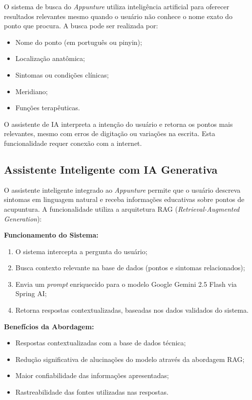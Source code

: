 O sistema de busca do \textit{Appunture} utiliza inteligência artificial para oferecer resultados relevantes mesmo quando o usuário não conhece o nome exato do ponto que procura. A busca pode ser realizada por:

\begin{itemize}
    \item Nome do ponto (em português ou pinyin);
    \item Localização anatômica;
    \item Sintomas ou condições clínicas;
    \item Meridiano;
    \item Funções terapêuticas.
\end{itemize}

O assistente de IA interpreta a intenção do usuário e retorna os pontos mais relevantes, mesmo com erros de digitação ou variações na escrita. Esta funcionalidade requer conexão com a internet.

\subsection{Assistente Inteligente com IA Generativa}

O assistente inteligente integrado ao \textit{Appunture} permite que o usuário descreva sintomas em linguagem natural e receba informações educativas sobre pontos de acupuntura. A funcionalidade utiliza a arquitetura RAG (\textit{Retrieval-Augmented Generation}):

\textbf{Funcionamento do Sistema:}
\begin{enumerate}
    \item O sistema intercepta a pergunta do usuário;
    \item Busca contexto relevante na base de dados (pontos e sintomas relacionados);
    \item Envia um \textit{prompt} enriquecido para o modelo Google Gemini 2.5 Flash via Spring AI;
    \item Retorna respostas contextualizadas, baseadas nos dados validados do sistema.
\end{enumerate}

\textbf{Benefícios da Abordagem:}
\begin{itemize}
    \item Respostas contextualizadas com a base de dados técnica;
    \item Redução significativa de alucinações do modelo através da abordagem RAG;
    \item Maior confiabilidade das informações apresentadas;
    \item Rastreabilidade das fontes utilizadas nas respostas.
\end{itemize}

